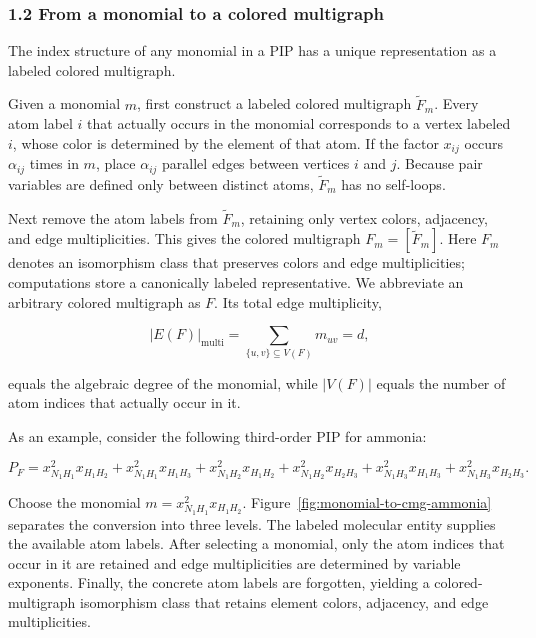 \subsubsection{1.2 From a monomial to a colored multigraph}\label{sec:monomial-to-cmg}

The index structure of any monomial in a PIP has a unique representation as a labeled colored multigraph.

Given a monomial \(m\), first construct a labeled colored multigraph \(\widetilde F_m\). Every atom label \(i\) that actually occurs in the monomial corresponds to a vertex labeled \(i\), whose color is determined by the element of that atom. If the factor \(x_{ij}\) occurs \(\alpha_{ij}\) times in \(m\), place \(\alpha_{ij}\) parallel edges between vertices \(i\) and \(j\). Because pair variables are defined only between distinct atoms, \(\widetilde F_m\) has no self-loops.

Next remove the atom labels from \(\widetilde F_m\), retaining only vertex colors, adjacency, and edge multiplicities. This gives the colored multigraph \(F_m=[\widetilde F_m]\). Here \(F_m\) denotes an isomorphism class that preserves colors and edge multiplicities; computations store a canonically labeled representative. We abbreviate an arbitrary colored multigraph as \(F\). Its total edge multiplicity,

\[
|E(F)|_{\mathrm{multi}}
=\sum_{\{u,v\}\subseteq V(F)}m_{uv}
=d,
\]

equals the algebraic degree of the monomial, while \(|V(F)|\) equals the number of atom indices that actually occur in it.

As an example, consider the following third-order PIP for ammonia:

\[P_F=x_{N_1H_1}^{2}x_{H_1H_2}+x_{N_1H_1}^{2}x_{H_1H_3}+x_{N_1H_2}^{2}x_{H_1H_2}+x_{N_1H_2}^{2}x_{H_2H_3}+x_{N_1H_3}^{2}x_{H_1H_3}+x_{N_1H_3}^{2}x_{H_2H_3}.\]

Choose the monomial \(m=x_{N_1H_1}^{2}x_{H_1H_2}\). Figure~\ref{fig:monomial-to-cmg-ammonia} separates the conversion into three levels. The labeled molecular entity supplies the available atom labels. After selecting a monomial, only the atom indices that occur in it are retained and edge multiplicities are determined by variable exponents. Finally, the concrete atom labels are forgotten, yielding a colored-multigraph isomorphism class that retains element colors, adjacency, and edge multiplicities.


